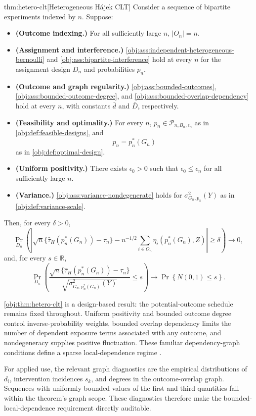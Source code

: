 \documentclass[11pt]{article}
\begin{document}
\begin{theoremv}{thm:hetero-clt}[Heterogeneous Hájek CLT]
Consider a sequence of bipartite experiments indexed by $n$. Suppose:
\begin{itemize}
\item \textbf{(Outcome indexing.)} For all sufficiently large $n$, $|O_n|=n$.
\item \textbf{(Assignment and interference.)} \cref{obj:ass:independent-heterogeneous-bernoulli} and \cref{obj:ass:bipartite-interference} hold at every $n$ for the assignment design $D_n$ and probabilities $p_n$.
\item \textbf{(Outcome and graph regularity.)} \cref{obj:ass:bounded-outcomes}, \cref{obj:ass:bounded-outcome-degree}, and \cref{obj:ass:bounded-overlap-dependency} hold at every $n$, with constants $\bar d$ and $\bar D$, respectively.
\item \textbf{(Feasibility and optimality.)} For every $n$, $p_n\in\mathcal P_{n,B_n,\epsilon_n}$ as in \cref{obj:def:feasible-designs}, and
\[
p_n=p_n^*(G_n)
\]
as in \cref{obj:def:optimal-design}.
\item \textbf{(Uniform positivity.)} There exists $\epsilon_0>0$ such that $\epsilon_0\le\epsilon_n$ for all sufficiently large $n$.
\item \textbf{(Variance.)} \cref{obj:ass:variance-nondegenerate} holds for $\sigma^2_{G_n,p_n}(Y)$ as in \cref{obj:def:variance-scale}.
\end{itemize}
Then, for every $\delta>0$,
\[
\Pr_{D_n}\!\left(
\left|
\sqrt n\bigl\{\widehat\tau_H(p_n^*(G_n))-\tau_n\bigr\}
-n^{-1/2}\sum_{i\in O_n}\eta_i(p_n^*(G_n),Z)
\right|\ge\delta
\right)\longrightarrow 0,
\]
and, for every $s\in\mathbb R$,
\[
\Pr_{D_n}\!\left(
\frac{\sqrt n\bigl\{\widehat\tau_H(p_n^*(G_n))-\tau_n\bigr\}}
{\sqrt{\sigma^2_{G_n,p_n^*(G_n)}(Y)}}\le s
\right)
\longrightarrow
\Pr\!\left\{N(0,1)\le s\right\}.
\]
\end{theoremv}

\cref{obj:thm:hetero-clt} is a design-based result: the potential-outcome schedule remains fixed throughout. Uniform positivity and bounded outcome degree control inverse-probability weights, bounded overlap dependency limits the number of dependent exposure terms associated with any outcome, and nondegeneracy supplies positive fluctuation. These familiar dependency-graph conditions define a sparse local-dependence regime \citep{AronowSamii2017GeneralInterference,LuShiFangZhangDing2025BipartiteDesign}.

For applied use, the relevant graph diagnostics are the empirical distributions of \(d_i\), intervention incidences \(s_k\), and degrees in the outcome-overlap graph. Sequences with uniformly bounded values of the first and third quantities fall within the theorem's graph scope. These diagnostics therefore make the bounded-local-dependence requirement directly auditable.
\end{document}
